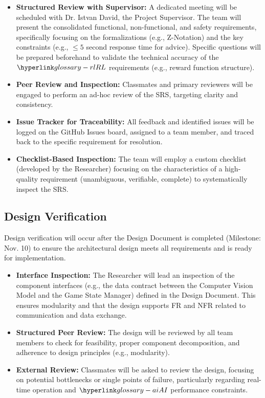 \documentclass[12pt, titlepage]{article}
\begin{document}
\begin{itemize}
    \item \textbf{Structured Review with Supervisor:} A dedicated meeting will be scheduled with Dr. Istvan David, the Project Supervisor.
    The team will present the consolidated functional, non-functional, and safety requirements, specifically focusing on the formalizations (e.g., Z-Notation) and the key constraints (e.g., $\leq 5$ second response time for advice).
    Specific questions will be prepared beforehand to validate the technical accuracy of the $\RL{}$ requirements (e.g., reward function structure).
    \item \textbf{Peer Review and Inspection:} Classmates and primary reviewers will be engaged to perform an ad-hoc review of the SRS, targeting clarity and consistency.
    \item \textbf{Issue Tracker for Traceability:} All feedback and identified issues will be logged on the GitHub Issues board, assigned to a team member, and traced back to the specific requirement for resolution.
    \item \textbf{Checklist-Based Inspection:} The team will employ a custom checklist (developed by the Researcher) focusing on the characteristics of a high-quality requirement (unambiguous, verifiable, complete) to systematically inspect the SRS.
\end{itemize}



\subsection{Design Verification}


Design verification will occur after the Design Document is completed (Milestone: Nov. 10) to ensure the architectural design meets all requirements and is ready for implementation.

\begin{itemize}
    \item \textbf{Interface Inspection:} The Researcher will lead an inspection of the component interfaces (e.g., the data contract between the Computer Vision Model and the Game State Manager) defined in the Design Document.
    This ensures modularity and that the design supports FR and NFR related to communication and data exchange.
    \item \textbf{Structured Peer Review:} The design will be reviewed by all team members to check for feasibility, proper component decomposition, and adherence to design principles (e.g., modularity).
    \item \textbf{External Review:} Classmates will be asked to review the design, focusing on potential bottlenecks or single points of failure, particularly regarding real-time operation and $\AI{}$ performance constraints.
\end{itemize}
\end{document}
